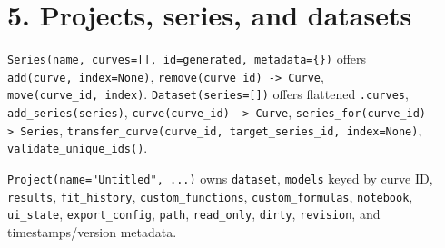 \documentclass[
  10pt,
  a4paper,
  oneside]{scrreprt}
\begin{document}
\hypertarget{projects-series-and-datasets}{%
\section{5. Projects, series, and
datasets}\label{projects-series-and-datasets}}

\texttt{Series(name,\ curves={[}{]},\ id=generated,\ metadata=\{\})}
offers \texttt{add(curve,\ index=None)},
\texttt{remove(curve\_id)\ -\textgreater{}\ Curve},
\texttt{move(curve\_id,\ index)}. \texttt{Dataset(series={[}{]})} offers
flattened \texttt{.curves}, \texttt{add\_series(series)},
\texttt{curve(curve\_id)\ -\textgreater{}\ Curve},
\texttt{series\_for(curve\_id)\ -\textgreater{}\ Series},
\texttt{transfer\_curve(curve\_id,\ target\_series\_id,\ index=None)},
\texttt{validate\_unique\_ids()}.

\texttt{Project(name="Untitled",\ ...)} owns \texttt{dataset},
\texttt{models} keyed by curve ID, \texttt{results},
\texttt{fit\_history}, \texttt{custom\_functions},
\texttt{custom\_formulas}, \texttt{notebook}, \texttt{ui\_state},
\texttt{export\_config}, \texttt{path}, \texttt{read\_only},
\texttt{dirty}, \texttt{revision}, and timestamps/version metadata.
\end{document}
